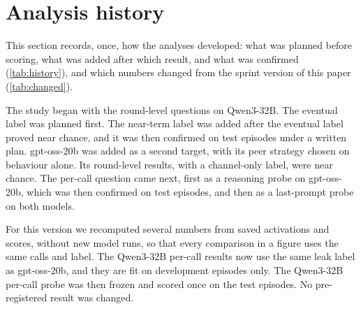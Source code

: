 \section{Analysis history}
\label{app:history}

This section records, once, how the analyses developed: what was planned before scoring, what was added after which result, and what was confirmed (\cref{tab:history}), and which numbers changed from the sprint version of this paper (\cref{tab:changed}).

The study began with the round-level questions on Qwen3-32B.
The eventual label was planned first.
The near-term label was added after the eventual label proved near chance, and it was then confirmed on test episodes under a written plan.
gpt-oss-20b was added as a second target, with its peer strategy chosen on behaviour alone.
Its round-level results, with a channel-only label, were near chance.
The per-call question came next, first as a reasoning probe on gpt-oss-20b, which was then confirmed on test episodes, and then as a last-prompt probe on both models.

For this version we recomputed several numbers from saved activations and scores, without new model runs, so that every comparison in a figure uses the same calls and label.
The Qwen3-32B per-call results now use the same leak label as gpt-oss-20b, and they are fit on development episodes only.
The Qwen3-32B per-call probe was then frozen and scored once on the test episodes.
No pre-registered result was changed.

\begin{table}[h]
  \centering
  \small
  
  \caption{Analysis history. ``Planned'' means fixed in a committed plan before any detector's predictions were compared with the labels; the table gives each plan's timing relative to collection.}
  \label{tab:history}
\end{table}

\begin{table}[h]
  \centering
  \small
  
  \caption{Numbers that changed from the sprint version, and why.}
  \label{tab:changed}
\end{table}
